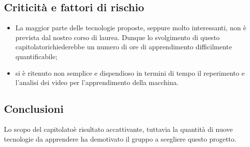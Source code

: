 \subsection{Criticità e fattori di rischio}
\begin{itemize}
	\item La maggior parte delle tecnologie proposte, seppure molto interessanti, non è prevista dal nostro corso di laurea. Dunque lo svolgimento di questo capitolato\glosp richiederebbe un numero di ore di apprendimento difficilmente quantificabile;
	\item si è ritenuto non semplice e dispendioso in termini di tempo il reperimento e l'analisi dei video per l'apprendimento della macchina.
\end{itemize}
\subsection{Conclusioni}
Lo scopo del capitolato\glosp è risultato accattivante, tuttavia la quantità di nuove tecnologie da apprendere ha demotivato il gruppo a scegliere questo progetto\glo.